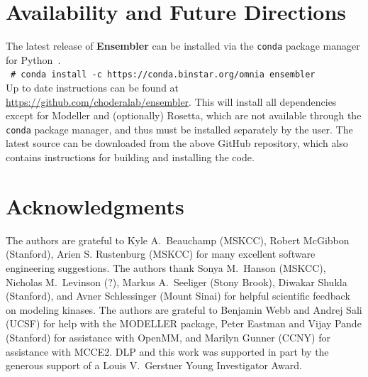 \documentclass[aps,pre,twocolumn,nofootinbib,superscriptaddress,linenumbers]{revtex4-1}
\newcommand{\shellcmd}[1]{\\\ \texttt{\scriptsize\# #1}\\}
\begin{document}
\section{Availability and Future Directions}
\label{section:availability}

The latest release of {\bf Ensembler} can be installed via the {\tt conda} package manager for Python~\cite{conda}.
\shellcmd{conda install -c https://conda.binstar.org/omnia ensembler}
Up to date instructions can be found at \url{https://github.com/choderalab/ensembler}.
This will install all dependencies except for Modeller and (optionally) Rosetta, which are not available through the {\tt conda} package manager, and thus must be installed separately by the user.
The latest source can be downloaded from the above GitHub repository, which also contains instructions for building and installing the code.


\section{Acknowledgments}
\label{section:acknowledgments}

The authors are grateful to Kyle A.~Beauchamp (MSKCC), Robert McGibbon (Stanford), Arien S. Rustenburg (MSKCC) for many excellent software engineering suggestions.
The authors thank Sonya M.~Hanson (MSKCC), Nicholas M.~Levinson (?), Markus A.~Seeliger (Stony Brook), Diwakar Shukla (Stanford), and Avner Schlessinger (Mount Sinai) for helpful scientific feedback on modeling kinases.
The authors are grateful to Benjamin Webb and Andrej Sali (UCSF) for help with the MODELLER package, Peter Eastman and Vijay Pande (Stanford) for assistance with OpenMM, and Marilyn Gunner (CCNY) for assistance with MCCE2.
DLP and this work was supported in part by the generous support of a Louis V.~Gerstner Young Investigator Award.


% 

\end{document}
